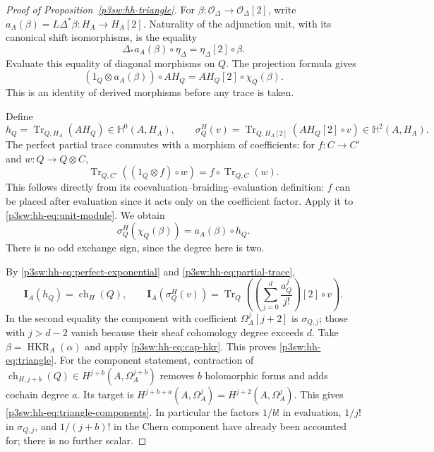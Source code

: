 \documentclass[11pt]{article}
\numberwithin{equation}{section}
\begin{document}
\begin{proof}[Proof of Proposition~\ref{p3sw:hh-triangle}]
For \(\beta:\mathcal O_\Delta\to\mathcal O_\Delta[2]\), write
\(a_A(\beta)=L\Delta^*\beta:H_A\to H_A[2]\).
Naturality of the adjunction unit, with its canonical shift
isomorphisms, is the equality
\[
 \Delta_*a_A(\beta)\circ\eta_\Delta
       =\eta_\Delta[2]\circ\beta.
\]
Evaluate this equality of diagonal morphisms on \(Q\).  The
projection formula gives
\begin{equation}
 (1_Q\otimes a_A(\beta))\circ AH_Q
       =AH_Q[2]\circ\chi_Q(\beta).
\label{p3sw:hh-eq:unit-module}
\end{equation}
This is an identity of derived morphisms before any trace is taken.

Define
\[
 h_Q=\operatorname{Tr}_{Q,H_A}(AH_Q)\in\mathbb H^0(A,H_A),
 \qquad
 \sigma_Q^H(v)
   =\operatorname{Tr}_{Q,H_A[2]}(AH_Q[2]\circ v)
        \in\mathbb H^2(A,H_A).
\]
The perfect partial trace commutes with a morphism of coefficients:
for \(f:C\to C'\) and \(w:Q\to Q\otimes C\),
\begin{equation}
 \operatorname{Tr}_{Q,C'}((1_Q\otimes f)\circ w)
      =f\circ\operatorname{Tr}_{Q,C}(w).
\label{p3sw:hh-eq:partial-trace}
\end{equation}
This follows directly from its coevaluation--braiding--evaluation
definition: \(f\) can be placed after evaluation since it acts only
on the coefficient factor.  Apply it to
\eqref{p3sw:hh-eq:unit-module}.  We obtain
\[
 \sigma_Q^H(\chi_Q(\beta))=a_A(\beta)\circ h_Q.
\]
There is no odd exchange sign, since the degree here is two.

By \eqref{p3sw:hh-eq:perfect-exponential} and
\eqref{p3sw:hh-eq:partial-trace},
\[
 \mathbf I_A(h_Q)=\operatorname{ch}_H(Q),\qquad
 \mathbf I_A(\sigma_Q^H(v))
     =\operatorname{Tr}_Q
          \left(\left(\sum_{j=0}^d\frac{a_Q^j}{j!}\right)[2]
                         \circ v\right).
\]
In the second equality the component with coefficient
\(\Omega_A^j[j+2]\) is \(\sigma_{Q,j}\); those with \(j>d-2\)
vanish because their sheaf cohomology degree exceeds \(d\).
Take \(\beta=\operatorname{HKR}_A(\alpha)\) and apply
\eqref{p3sw:hh-eq:cap-hkr}.  This proves
\eqref{p3sw:hh-eq:triangle}.
For the component statement, contraction of
\(\operatorname{ch}_{H,j+b}(Q)\in
 H^{j+b}(A,\Omega_A^{j+b})\) removes \(b\) holomorphic forms and
adds cochain degree \(a\).  Its target is
\(H^{j+b+a}(A,\Omega_A^j)=H^{j+2}(A,\Omega_A^j)\).
This gives \eqref{p3sw:hh-eq:triangle-components}.
In particular the factors \(1/b!\) in evaluation, \(1/j!\) in
\(\sigma_{Q,j}\), and \(1/(j+b)!\) in the Chern component have
already been accounted for; there is no further scalar.
\end{proof}
\end{document}
